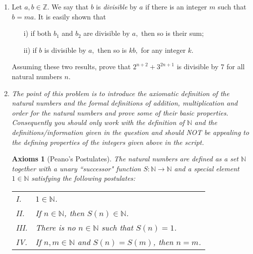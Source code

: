 \documentclass[11pt]{article}
\newcommand{\bbN}{\mathbb{N}}
\newcommand{\bbZ}{\mathbb{Z}}
\newtheorem*{axioms}{Axioms}
\begin{document}
\begin{enumerate}
\begin{proof}
The above is equivalent to 
\[
\sum_{k=0}^{n+1}  \left(\begin{array}{c} n+1\\ k\end{array}\right) x^{n+1-k}y^k.
\]

This completes the proof.

\renewcommand\qedsymbol{QED}
\end{proof}


\item Let $a,b\in\bbZ.$ We say that $b$ is {\em divisible} by $a$ if there is an integer $m$ such that $b=ma.$ It is easily shown that
\begin{enumerate}
\item[i)] if both $b_1$ and $b_2$ are divisible by $a,$ then so is their sum;
\item[ii)] if $b$ is divisible by $a,$ then so is $kb,$ for any integer $k.$
\end{enumerate}
Assuming these two results, prove that $2^{n+2}+3^{2n+1}$ is divisible by 7 for all natural numbers $n.$




\item {\em The point of this problem is to introduce the axiomatic definition of the natural numbers and the formal definitions of addition, multiplication and order for the natural numbers and prove some of their basic properties. Consequently you should only work with the definition of $\bbN$ and the definitions/information given in the question and should NOT be appealing to the defining 
properties of the integers given above in the script.}




\begin{axioms}[Peano's Postulates]
The natural numbers are defined as a set ${\mathbb N}$ together with a unary 
``successor" function $S:{\mathbb N}\rightarrow {\mathbb N}$
and a special element $1\in {\mathbb N}$ satisfying the following postulates:

\begin{tabular}{ll}
I.  & $1\in {\mathbb N}$.  \\

II. &  If $n\in {\mathbb N}$, then $S(n)\in {\mathbb N}$.  \\

III.  &  There is no $n\in {\mathbb N}$ such that $S(n)=1$.  \\

IV.  &  If $n, m\in {\mathbb N}$ and $S(n)=S(m)$, then $n=m$.  \\


\end{tabular}
\end{axioms}
\end{enumerate}
\end{document}
